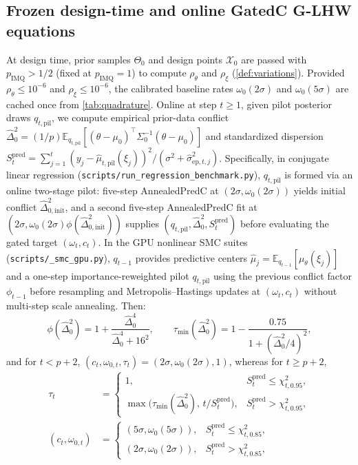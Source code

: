 \documentclass[11pt,a4paper,reqno]{amsart}
\theoremstyle{definition}
\theoremstyle{remark}
\newcommand{\E}{\mathbb{E}}
\newcommand{\Xcal}{\mathcal{X}}
\begin{document}
\subsection{Frozen design-time and online GatedC G-LHW equations}
At design time, prior samples $\Theta_0$ and design points $\Xcal_0$ are passed with $p_{\mathrm{IMQ}} > 1/2$ (fixed at $p_{\mathrm{IMQ}} = 1$) to compute $\rho_\theta$ and $\rho_\xi$ (\cref{def:variations}). Provided $\rho_\theta \le 10^{-6}$ and $\rho_\xi \le 10^{-6}$, the calibrated baseline rates $\omega_0(2\sigma)$ and $\omega_0(5\sigma)$ are cached once from \cref{tab:quadrature}. Online at step $t \ge 1$, given pilot posterior draws $q_{t,\mathrm{pil}}$, we compute empirical prior-data conflict $\hat{\Delta}_0^2 = (1/p)\E_{q_{t,\mathrm{pil}}}[(\theta - \mu_0)^\top \Sigma_0^{-1} (\theta - \mu_0)]$ and standardized dispersion $S_t^{\mathrm{pred}} = \sum_{j=1}^t (y_j - \hat{\mu}_{t,\mathrm{pil}}(\xi_j))^2 / (\sigma^2 + \hat{\sigma}_{\mathrm{ep}, t, j}^2)$. Specifically, in conjugate linear regression (\nolinkurl{scripts/run_regression_benchmark.py}), $q_{t,\mathrm{pil}}$ is formed via an online two-stage pilot: five-step AnnealedPredC at $(2\sigma, \omega_0(2\sigma))$ yields initial conflict $\hat{\Delta}_{0,\mathrm{init}}^2$, and a second five-step AnnealedPredC fit at $(2\sigma, \omega_0(2\sigma)\phi(\hat{\Delta}_{0,\mathrm{init}}^2))$ supplies $(q_{t,\mathrm{pil}}, \hat{\Delta}_0^2, S_t^{\mathrm{pred}})$ before evaluating the gated target $(\omega_t, c_t)$. In the GPU nonlinear SMC suites (\nolinkurl{scripts/_smc_gpu.py}), $q_{t-1}$ provides predictive centers $\hat{\mu}_j = \E_{q_{t-1}}[\mu_\theta(\xi_j)]$ and a one-step importance-reweighted pilot $q_{t,\mathrm{pil}}$ using the previous conflict factor $\phi_{t-1}$ before resampling and Metropolis--Hastings updates at $(\omega_t, c_t)$ without multi-step scale annealing. Then:
\[
\phi(\hat{\Delta}_0^2) = 1 + \frac{\hat{\Delta}_0^4}{\hat{\Delta}_0^4 + 16^2}, \qquad
\tau_{\min}(\hat{\Delta}_0^2) = 1 - \frac{0.75}{1 + (\hat{\Delta}_0^2 / 4)^2},
\]
and for $t < p + 2$, $(c_t, \omega_{0,t}, \tau_t) = (2\sigma, \omega_0(2\sigma), 1)$, whereas for $t \ge p + 2$,
\begin{align*}
\tau_t &= \begin{cases} 1, & S_t^{\mathrm{pred}} \le \chi^2_{t, 0.95}, \\ \max\!\bigl(\tau_{\min}(\hat{\Delta}_0^2),\, t / S_t^{\mathrm{pred}}\bigr), & S_t^{\mathrm{pred}} > \chi^2_{t, 0.95}, \end{cases}\\
(c_t, \omega_{0,t}) &= \begin{cases} (5\sigma, \omega_0(5\sigma)), & S_t^{\mathrm{pred}} \le \chi^2_{t, 0.85}, \\ (2\sigma, \omega_0(2\sigma)), & S_t^{\mathrm{pred}} > \chi^2_{t, 0.85}, \end{cases}
\end{align*}
\end{document}
